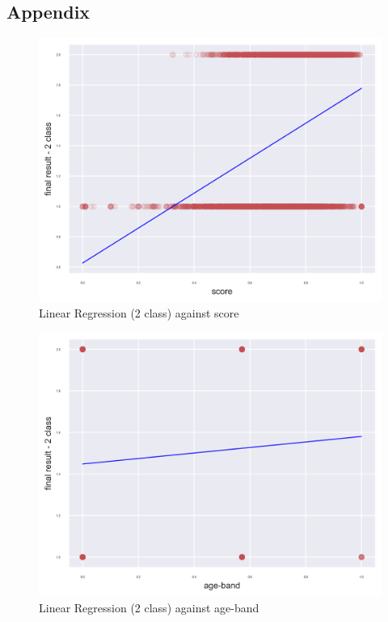 \documentclass[11pt, a4paper]{article}
\begin{document}
\begin{multicols}{2}
\section*{Appendix}
\centering
\begin{figure}[H]
	\vspace{-0.4cm}
	\includegraphics[width=\linewidth]{LinearRegression_2_class_model_against_score.png} 
	\caption{Linear Regression (2 class) against score}
	\label{fig:LinScore}
\end{figure}

\centering
\begin{figure}[H]
	\vspace{-0.4cm}
	\includegraphics[width=\linewidth]{LinearRegression_2_class_model_against_age-band.png} 
	\caption{Linear Regression (2 class) against age-band}
	\label{fig:LinAge}
\end{figure}


\end{multicols}
\end{document}
